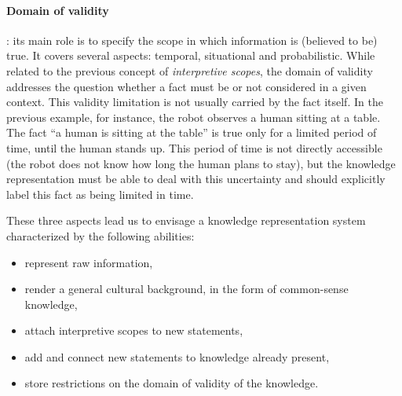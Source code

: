 \documentclass[twocolumn]{svjour3}
\begin{document}
\paragraph{Domain of validity}: its main role is to specify the scope in which
 information is (believed to be) true. It covers several aspects: temporal,
situational and probabilistic. While related to the previous concept of
\emph{interpretive scopes}, the domain of validity addresses the question
whether a fact must be or not considered in a given context. This validity
limitation is not usually carried by the fact itself. In the previous example,
for instance, the robot observes a human sitting at a table.  The fact ``a
human is sitting at the table'' is true only for a limited period of time,
until the human stands up. This period of time is not directly accessible
(the robot does not know how long the human plans to stay), but the
knowledge representation must be able to deal with this uncertainty and
should explicitly label this fact as being limited in time.

These three aspects lead us to envisage a knowledge representation system
characterized by the following abilities: 
\begin{itemize}
	\item represent raw information,
	\item render a general cultural background, in the form of common-sense knowledge,
	\item attach interpretive scopes to new statements,
	\item add and connect new statements to knowledge already present,
	\item store restrictions on the domain of validity of the knowledge.
\end{itemize}
\end{document}
